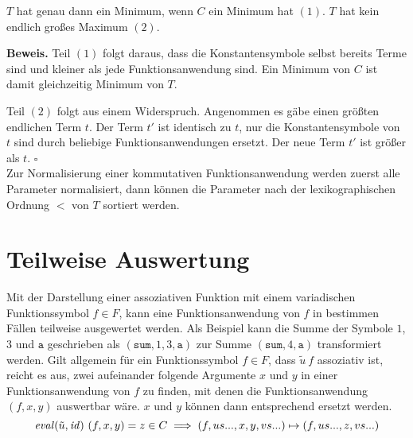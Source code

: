 \begin{lemma} \label{lemMinMax}
$T$ hat genau dann ein Minimum, wenn $C$ ein Minimum hat $(1)$. $T$ hat kein endlich großes Maximum $(2)$.
\end{lemma}

\textbf{Beweis.}
Teil $(1)$ folgt daraus, dass die Konstantensymbole selbst bereits Terme sind und kleiner als jede Funktionsanwendung sind. Ein Minimum von $C$ ist damit gleichzeitig Minimum von $T$.

Teil $(2)$ folgt aus einem Widerspruch. Angenommen es gäbe einen größten endlichen Term $t$. Der Term $t'$ ist identisch zu $t$, nur die Konstantensymbole von $t$ sind durch beliebige Funktionsanwendungen ersetzt. Der neue Term $t'$ ist größer als $t$.
\hfill $\square$\\

Zur Normalisierung einer kommutativen Funktionsanwendung werden zuerst alle Parameter normalisiert, dann können die Parameter nach der lexikographischen Ordnung $<$ von $T$ sortiert werden. 

\section{Teilweise Auswertung} \label{subsecNormalKombinieren}

\begin{algorithm}
\DontPrintSemicolon
\caption{$\Const{combine} \colon T \rightarrow T$}\label{combine}

\end{algorithm}

Mit der Darstellung einer assoziativen Funktion mit einem variadischen Funktionssymbol $f \in F$, kann eine Funktionsanwendung von $f$ in bestimmen Fällen teilweise ausgewertet werden. Als Beispiel kann die Summe der Symbole $1$, $3$ und $\texttt{a}$ geschrieben als $(\texttt{sum}, 1, 3, \texttt{a})$ zur Summe $(\texttt{sum}, 4, \texttt{a})$ transformiert werden. 
Gilt allgemein für ein Funktionssymbol $f \in F$, dass $\tilde u~f$ assoziativ ist, reicht es aus, zwei aufeinander folgende Argumente $x$ und $y$ in einer Funktionsanwendung von $f$ zu finden, mit denen die Funktionsanwendung $(f, x, y)$ auswertbar wäre. $x$ und $y$ können dann entsprechend ersetzt werden.
$$\mathit{eval}(\tilde u, \mathit{id})~(f, x, y) = z \in C \implies (f, us..., x, y, vs...) \mapsto (f, us..., z, vs...)$$

